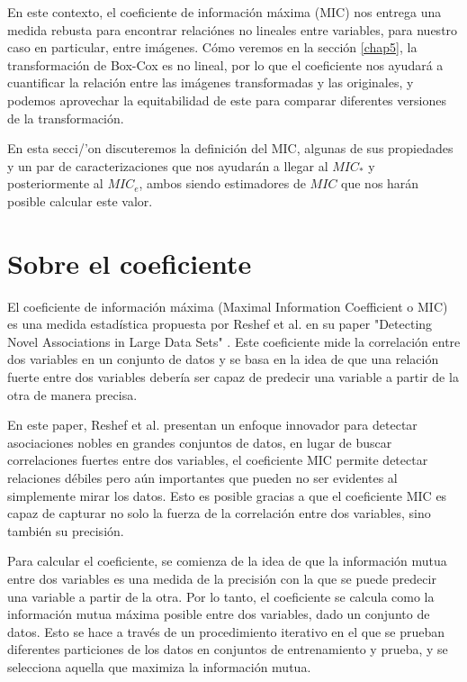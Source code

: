 En este contexto, el coeficiente de informaci\'on m\'axima (MIC) nos entrega una medida rebusta para encontrar relaci\'ones no lineales entre variables, para nuestro caso en particular, entre im\'agenes. C\'omo veremos en la secci\'on \ref{chap5}, la transformaci\'on de Box-Cox es no lineal, por lo que el coeficiente nos ayudar\'a a cuantificar la relaci\'on entre las im\'agenes transformadas y las originales, y podemos aprovechar la equitabilidad de este para comparar diferentes versiones de la transformaci\'on.

En esta secci/'on discuteremos la definici\'on del MIC, algunas de sus propiedades y un par de caracterizaciones que nos ayudar\'an a llegar al $MIC_*$ y posteriormente al $MIC_e$, ambos siendo estimadores de $MIC$ que nos har\'an posible calcular este valor. 

\section{Sobre el coeficiente}

	El coeficiente de informaci\'on m\'axima (Maximal Information Coefficient o MIC) es una medida estad\'istica propuesta por Reshef et al. en su paper "Detecting Novel Associations in Large Data Sets" \cite{Reshef2011}. Este coeficiente mide la correlaci\'on entre dos variables en un conjunto de datos y se basa en la idea de que una relaci\'on fuerte entre dos variables deber\'ia ser capaz de predecir una variable a partir de la otra de manera precisa.

	En este paper, Reshef et al. presentan un enfoque innovador para detectar asociaciones nobles en grandes conjuntos de datos, en lugar de buscar correlaciones fuertes entre dos variables, el coeficiente MIC permite detectar relaciones d\'ebiles pero a\'un importantes que pueden no ser evidentes al simplemente mirar los datos. Esto es posible gracias a que el coeficiente MIC es capaz de capturar no solo la fuerza de la correlaci\'on entre dos variables, sino tambi\'en su precisi\'on.

	Para calcular el coeficiente, se comienza de la idea de que la informaci\'on mutua entre dos variables es una medida de la precisi\'on con la que se puede predecir una variable a partir de la otra. Por lo tanto, el coeficiente se calcula como la informaci\'on mutua m\'axima posible entre dos variables, dado un conjunto de datos. Esto se hace a trav\'es de un procedimiento iterativo en el que se prueban diferentes particiones de los datos en conjuntos de entrenamiento y prueba, y se selecciona aquella que maximiza la informaci\'on mutua.

